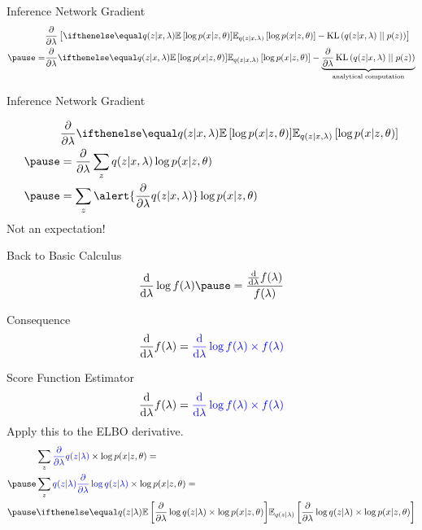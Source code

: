 \documentclass[14pt]{beamer}
\begin{document}
\begin{frame}{Inference Network Gradient}
\begin{equation*}
\begin{aligned}
&\pdv{\lambda}\left[\E[q(z|x,\lambda)]{\log p(x|z,\theta)} - \KL{q(z|x,\lambda)}{p(z)} \right] \\ \pause
=&\pdv{\lambda}\E[q(z|x,\lambda)]{\log p(x|z,\theta)} - \underbrace{\pdv{\lambda}\KL{q(z|x,\lambda)}{p(z)}}_{\text{analytical computation}} \\
\end{aligned}
\end{equation*}
\pause
{}
\end{frame}

\begin{frame}{Inference Network Gradient}

\begin{equation*}
\begin{aligned}
&\pdv{\lambda}\E[q(z|x,\lambda)]{\log p(x|z,\theta)} \\ \pause
&= \pdv{\lambda} \sum_{z}q(z|x,\lambda)\log p(x|z,\theta) \\ \pause
&= \sum_{z}\alert{\pdv{\lambda} q(z|x,\lambda)}\log p(x|z,\theta)
\end{aligned}
\end{equation*}
\pause
Not an expectation!
\end{frame}

\begin{frame}{Back to Basic Calculus}
\begin{equation*}
\dv{\lambda}\log f(\lambda) \pause = \frac{\dv{\lambda}f(\lambda)}{f(\lambda)}
\end{equation*}
\pause
\begin{block}{Consequence}
\begin{equation*}
\dv{\lambda}f(\lambda) = \textcolor{blue}{\dv{\lambda}\log f(\lambda) \times f(\lambda)}
\end{equation*}
\end{block}
\end{frame}

\begin{frame}{Score Function Estimator}
\begin{equation*}
\dv{\lambda}f(\lambda) = \textcolor{blue}{\dv{\lambda}\log f(\lambda) \times f(\lambda)}
\end{equation*}
\pause
Apply this to the ELBO derivative.
\begin{equation*}
\begin{aligned}
&\sum_{z}\textcolor{blue}{\frac{\partial}{\partial \lambda}q(z|\lambda)}\times\log p(x|z,\theta) = \\
\pause
&\sum_{z}\textcolor{blue}{q(z|\lambda)\frac{\partial}{\partial \lambda}\log q(z|\lambda)} \times \log p(x|z,\theta) = \\
\pause
&\E[q(z|\lambda)]{\frac{\partial}{\partial \lambda}\log q(z|\lambda) \times \log p(x|z,\theta)}
\end{aligned}
\end{equation*}
\end{frame}
\end{document}

